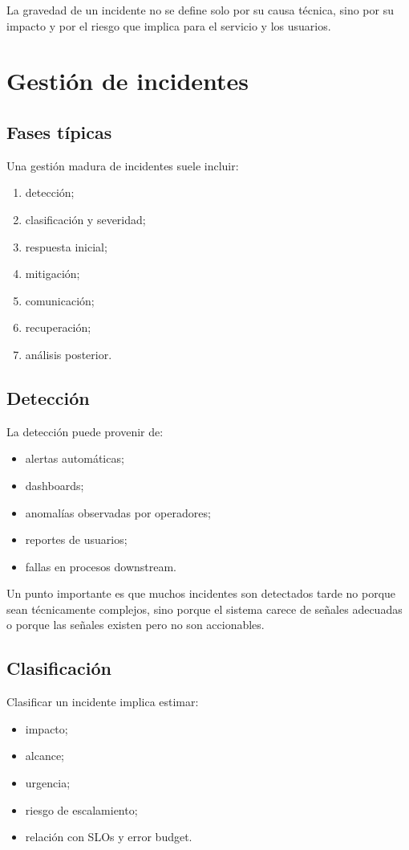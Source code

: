 \documentclass[variant=apuntes,cover=institutional,mode=screen]{ua-engineering-v6-article}
\begin{document}
La gravedad de un incidente no se define solo por su causa técnica, sino por su impacto y por el riesgo que implica para el servicio y los usuarios.

\section{Gestión de incidentes}

\subsection{Fases típicas}

Una gestión madura de incidentes suele incluir:

\begin{enumerate}
\item detección;
\item clasificación y severidad;
\item respuesta inicial;
\item mitigación;
\item comunicación;
\item recuperación;
\item análisis posterior.
\end{enumerate}

\subsection{Detección}

La detección puede provenir de:
\begin{itemize}
\item alertas automáticas;
\item dashboards;
\item anomalías observadas por operadores;
\item reportes de usuarios;
\item fallas en procesos downstream.
\end{itemize}

Un punto importante es que muchos incidentes son detectados tarde no porque sean técnicamente complejos, sino porque el sistema carece de señales adecuadas o porque las señales existen pero no son accionables.

\subsection{Clasificación}

Clasificar un incidente implica estimar:
\begin{itemize}
\item impacto;
\item alcance;
\item urgencia;
\item riesgo de escalamiento;
\item relación con SLOs y error budget.
\end{itemize}
\end{document}
